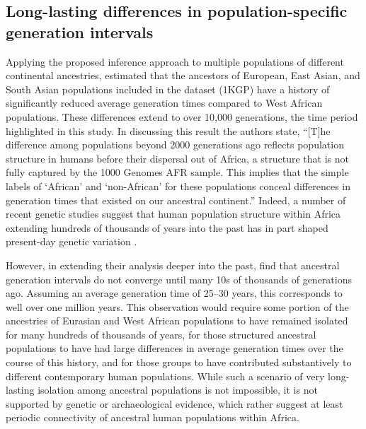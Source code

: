 \documentclass[]{article}
\begin{document}
\subsection*{Long-lasting differences in population-specific generation intervals}

Applying the proposed inference approach to multiple populations of different
continental ancestries, \citet{wang2023human} estimated that the ancestors of
European, East Asian, and South Asian populations included in the
\citet{1000genomes2015} dataset (1KGP) have a history of significantly reduced
average generation times compared to West African populations. These
differences extend to over 10,000 generations, the time period highlighted in
this study. In discussing this result the authors state, ``[T]he difference
among populations beyond 2000 generations ago reflects population structure in
humans before their dispersal out of Africa, a structure that is not fully
captured by the 1000 Genomes AFR sample. This implies that the simple labels of
`African' and `non-African' for these populations conceal differences in
generation times that existed on our ancestral continent.'' Indeed, a number of
recent genetic studies suggest that human population structure within Africa
extending hundreds of thousands of years into the past has in part shaped
present-day genetic variation
\citep{hammer2011genetic,hsieh2016model,hey2018phylogeny,
ragsdale2019models,lorente2019whole,durvasula2020recovering}.

However, in extending their analysis deeper into the past,
\citet{wang2023human} find that ancestral generation intervals do not converge
until many 10s of thousands of generations ago. Assuming an average generation
time of 25--30 years, this corresponds to well over one million years. This
observation would require some portion of the ancestries of Eurasian and West
African populations to have remained isolated for many hundreds of thousands of
years, for those structured ancestral populations to have had large differences
in average generation times over the course of this history, and for those
groups to have contributed substantively to different contemporary human
populations. While such a scenario of very long-lasting isolation among
ancestral populations is not impossible, it is not supported by genetic
\citep{ragsdale2022weakly} or archaeological
\citep{scerri2018did} evidence, which rather suggest at least periodic
connectivity of ancestral human populations within Africa.
\end{document}
